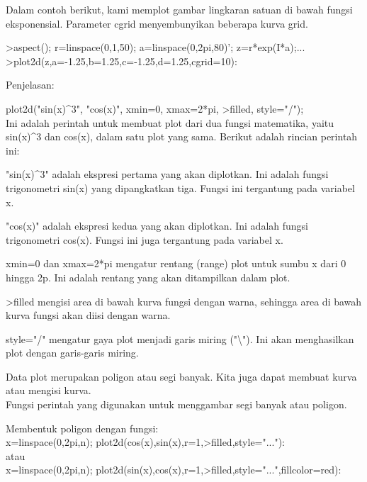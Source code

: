 \documentclass[a4paper,10pt]{article}
\begin{document}
\begin{eulernotebook}
\begin{eulercomment}
\begin{eulercomment}
\begin{eulercomment}
\begin{eulercomment}
\begin{eulercomment}
\begin{eulercomment}
\begin{eulercomment}
Dalam contoh berikut, kami memplot gambar lingkaran satuan di bawah
fungsi eksponensial. Parameter cgrid menyembunyikan beberapa kurva
grid.

\begin{eulercomment}
\begin{eulerprompt}
>aspect(); r=linspace(0,1,50); a=linspace(0,2pi,80)'; z=r*exp(I*a);...
>plot2d(z,a=-1.25,b=1.25,c=-1.25,d=1.25,cgrid=10):
\end{eulerprompt}
\begin{eulercomment}
Penjelasan:

plot2d("sin(x)\textasciicircum{}3", "cos(x)", xmin=0, xmax=2*pi, \textgreater{}filled, style="/");\\
Ini adalah perintah untuk membuat plot dari dua fungsi matematika,
yaitu sin(x)\textasciicircum{}3 dan cos(x), dalam satu plot yang sama. Berikut adalah
rincian perintah ini:

"sin(x)\textasciicircum{}3" adalah ekspresi pertama yang akan diplotkan. Ini adalah
fungsi trigonometri sin(x) yang dipangkatkan tiga. Fungsi ini
tergantung pada variabel x.

"cos(x)" adalah ekspresi kedua yang akan diplotkan. Ini adalah fungsi
trigonometri cos(x). Fungsi ini juga tergantung pada variabel x.

xmin=0 dan xmax=2*pi mengatur rentang (range) plot untuk sumbu x dari
0 hingga 2p. Ini adalah rentang yang akan ditampilkan dalam plot.

\textgreater{}filled mengisi area di bawah kurva fungsi dengan warna, sehingga area
di bawah kurva fungsi akan diisi dengan warna.

style="/" mengatur gaya plot menjadi garis miring ("\textbackslash{}"). Ini akan
menghasilkan plot dengan garis-garis miring.
\end{eulercomment}
\begin{eulercomment}
Data plot merupakan poligon atau segi banyak. Kita juga dapat membuat
kurva atau mengisi kurva.\\
Fungsi perintah yang digunakan untuk menggambar segi banyak atau
poligon.

Membentuk poligon dengan fungsi:\\
x=linspace(0,2pi,n); plot2d(cos(x),sin(x),r=1,\textgreater{}filled,style="..."):\\
atau\\
x=linspace(0,2pi,n);
plot2d(sin(x),cos(x),r=1,\textgreater{}filled,style="...",fillcolor=red):


\end{eulercomment}
\end{eulercomment}
\end{eulercomment}
\end{eulercomment}
\end{eulercomment}
\end{eulercomment}
\end{eulercomment}
\end{eulercomment}
\end{eulercomment}
\end{eulernotebook}
\end{document}
